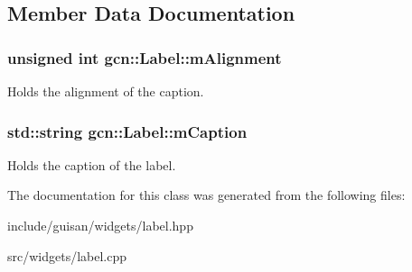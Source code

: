 \subsection{Member Data Documentation}
\subsubsection[{\texorpdfstring{m\+Alignment}{mAlignment}}]{\setlength{\rightskip}{0pt plus 5cm}unsigned int gcn\+::\+Label\+::m\+Alignment\hspace{0.3cm}{\ttfamily [protected]}}\hypertarget{classgcn_1_1Label_a2558f49c5f6ff298242cc920a8865dc1}{}\label{classgcn_1_1Label_a2558f49c5f6ff298242cc920a8865dc1}
Holds the alignment of the caption. 
\subsubsection[{\texorpdfstring{m\+Caption}{mCaption}}]{\setlength{\rightskip}{0pt plus 5cm}std\+::string gcn\+::\+Label\+::m\+Caption\hspace{0.3cm}{\ttfamily [protected]}}\hypertarget{classgcn_1_1Label_a28ee6b71529d6bd7e662c01449b6b4d5}{}\label{classgcn_1_1Label_a28ee6b71529d6bd7e662c01449b6b4d5}
Holds the caption of the label. 

The documentation for this class was generated from the following files\+:\begin{DoxyCompactItemize}
\item 
include/guisan/widgets/label.\+hpp\item 
src/widgets/label.\+cpp\end{DoxyCompactItemize}
